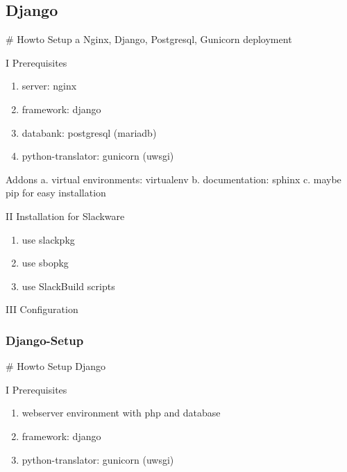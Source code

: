 \documentclass[letterpaper,10pt,english]{sphinxmanual}
\begin{document}
\subsection{Django}
\label{sdocs/django/django::doc}\label{sdocs/django/django:django}
\# Howto Setup a Nginx, Django, Postgresql, Gunicorn deployment

I Prerequisites
\begin{enumerate}
\item {} 
server: nginx

\item {} 
framework: django

\item {} 
databank: postgresql (mariadb)

\item {} 
python-translator: gunicorn (uwsgi)

\end{enumerate}

Addons
a. virtual environments: virtualenv
b. documentation: sphinx
c. maybe pip for easy installation

II Installation for Slackware
\begin{enumerate}
\item {} 
use slackpkg

\item {} 
use sbopkg

\item {} 
use SlackBuild scripts

\end{enumerate}

III Configuration


\subsubsection{Django-Setup}
\label{sdocs/django/django-setup/django-setup:django-setup}\label{sdocs/django/django-setup/django-setup::doc}
\# Howto Setup Django

I Prerequisites
\begin{enumerate}
\item {} 
webserver environment with php and database

\item {} 
framework: django

\item {} 
python-translator: gunicorn (uwsgi)

\end{enumerate}
\end{document}
